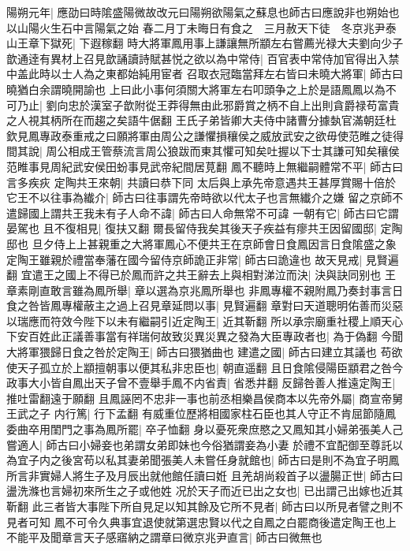 陽朔元年|{
	應劭曰時隂盛陽微故改元曰陽朔欲陽氣之蘇息也師古曰應說非也朔始也以山陽火生石中言陽氣之始}
春二月丁未晦日有食之　三月赦天下徒　冬京兆尹泰山王章下獄死|{
	下遐稼翻}
時大將軍鳳用事上謙讓無所顓左右嘗薦光禄大夫劉向少子歆通逹有異材上召見歆誦讀詩賦甚悦之欲以為中常侍|{
	百官表中常侍加官得出入禁中盖此時以士人為之東都始純用宦者}
召取衣冠臨當拜左右皆曰未曉大將軍|{
	師古曰曉猶白余謂曉開諭也}
上曰此小事何須關大將軍左右叩頭争之上於是語鳳鳳以為不可乃止|{
	劉向忠於漢室子歆附從王莽得無由此邪爵賞之柄不自上出則貪爵禄苟富貴之人視其柄所在而趨之矣語牛倨翻}
王氏子弟皆卿大夫侍中諸曹分據埶官滿朝廷杜欽見鳳專政泰重戒之曰願將軍由周公之謙懼損穰侯之威放武安之欲毋使范睢之徒得間其說|{
	周公相成王管蔡流言周公狼跋而東其懼可知矣吐握以下士其謙可知矣穰侯范睢事見周紀武安侯田蚡事見武帝紀間居莧翻}
鳳不聽時上無繼嗣體常不平|{
	師古曰言多疾疢}
定陶共王來朝|{
	共讀曰恭下同}
太后與上承先帝意遇共王甚厚賞賜十倍於它王不以往事為纎介|{
	師古曰往事謂先帝時欲以代太子也言無纎介之嫌}
留之京師不遣歸國上謂共王我未有子人命不諱|{
	師古曰人命無常不可諱}
一朝有它|{
	師古曰它謂晏駕也}
且不復相見|{
	復扶又翻}
爾長留侍我矣其後天子疾益有瘳共王因留國邸|{
	定陶邸也}
旦夕侍上上甚親重之大將軍鳳心不便共王在京師會日食鳳因言日食隂盛之象定陶王雖親於禮當奉藩在國今留侍京師詭正非常|{
	師古曰詭違也}
故天見戒|{
	見賢遍翻}
宜遣王之國上不得已於鳳而許之共王辭去上與相對涕泣而決|{
	決與訣同别也}
王章素剛直敢言雖為鳳所舉|{
	章以選為京兆鳳所舉也}
非鳳專權不親附鳳乃奏封事言日食之咎皆鳳專權蔽主之過上召見章延問以事|{
	見賢遍翻}
章對曰天道聰明佑善而災惡以瑞應而符效今陛下以未有繼嗣引近定陶王|{
	近其靳翻}
所以承宗廟重社稷上順天心下安百姓此正議善事當有祥瑞何故致災異災異之發為大臣專政者也|{
	為于偽翻}
今聞大將軍猥歸日食之咎於定陶王|{
	師古曰猥猶曲也}
建遣之國|{
	師古曰建立其議也}
苟欲使天子孤立於上顓擅朝事以便其私非忠臣也|{
	朝直遥翻}
且日食隂侵陽臣顓君之咎今政事大小皆自鳳出天子曾不壹舉手鳳不内省責|{
	省悉井翻}
反歸咎善人推遠定陶王|{
	推吐雷翻遠于願翻}
且鳳誣罔不忠非一事也前丞相樂昌侯商本以先帝外屬|{
	商宣帝舅王武之子}
内行篤|{
	行下孟翻}
有威重位歷將相國家柱石臣也其人守正不肯屈節隨鳳委曲卒用閨門之事為鳳所罷|{
	卒子恤翻}
身以憂死衆庶愍之又鳳知其小婦弟張美人己嘗適人|{
	師古曰小婦妾也弟謂女弟即妹也今俗猶謂妾為小妻}
於禮不宜配御至尊託以為宜子内之後宮苟以私其妻弟聞張美人未嘗任身就館也|{
	師古曰是則不為宜子明鳳所言非實婦人將生子及月辰出就他館任讀曰姙}
且羌胡尚殺首子以盪腸正世|{
	師古曰盪洗滌也言婦初來所生之子或他姓}
况於天子而近已出之女也|{
	已出謂己出嫁也近其靳翻}
此三者皆大事陛下所自見足以知其餘及它所不見者|{
	師古曰以所見者譬之則不見者可知}
鳳不可令久典事宜退使就第選忠賢以代之自鳳之白罷商後遣定陶王也上不能平及聞章言天子感寤納之謂章曰微京兆尹直言|{
	師古曰微無也}
